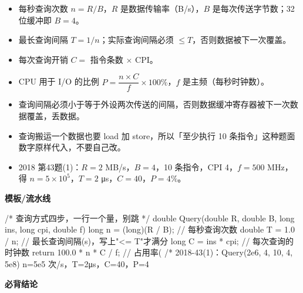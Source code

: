 \documentclass[10pt,a4paper]{ctexart}
\begin{document}
\begin{itemize}

\item 每秒查询次数 $n=R/B$，$R$ 是数据传输率（B/s），$B$ 是每次传送字节数；32 位缓冲即 $B=4$。

\item 最长查询间隔 $T=1/n$；实际查询间隔必须 $\le T$，否则数据被下一次覆盖。

\item 每次查询开销 $C=$ 指令条数 $\times$ CPI。

\item CPU 用于 I/O 的比例 $P=\dfrac{n\times C}{f}\times 100\%$，$f$ 是主频（每秒时钟数）。

\item 查询间隔必须小于等于外设两次传送的间隔，否则数据缓冲寄存器被下一次数据覆盖，丢数据。

\item 查询搬运一个数据也要 load 加 store，所以「至少执行 10 条指令」这种题面数字原样代入，不要自己改。

\item 2018 第43题(1)：$R=2$ MB/s，$B=4$，10 条指令，CPI 4，$f=500$ MHz，得 $n=5\times10^5$，$T=2$ μs，$C=40$，$P=4\%$。

\end{itemize}

\textbf{模板/流水线}

\begin{codebox}
/* 查询方式四步，一行一个量，别跳 */
double Query(double R, double B, long ins, long cpi, double f) {
    long   n = (long)(R / B);        // 每秒查询次数
    double T = 1.0 / n;              // 最长查询间隔(s)，写上"<= T"才满分
    long   C = ins * cpi;            // 每次查询的时钟数
    return 100.0 * n * C / f;        // 占用率(%
}
/* 2018-43(1)：Query(2e6, 4, 10, 4, 5e8)
   n=5e5 次/s，T=2μs，C=40，P=4%
\end{codebox}





\textbf{必背结论}
\end{document}
